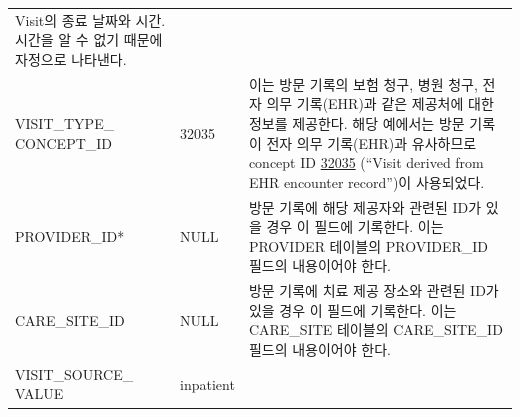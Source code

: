 \documentclass[11pt]{book}
\theoremstyle{definition}
\theoremstyle{definition}
\theoremstyle{definition}
\theoremstyle{remark}
\begin{document}
\begin{longtable}[]{@{}lll@{}}
\begin{minipage}[t]{0.48\columnwidth}
Visit의 종료 날짜와 시간. 시간을 알 수 없기 때문에 자정으로
나타낸다.\strut
\end{minipage}\tabularnewline
\begin{minipage}[t]{0.28\columnwidth}\raggedright\strut
VISIT\_TYPE\_ CONCEPT\_ID\strut
\end{minipage} & \begin{minipage}[t]{0.16\columnwidth}\raggedright\strut
32035\strut
\end{minipage} & \begin{minipage}[t]{0.48\columnwidth}\raggedright\strut
이는 방문 기록의 보험 청구, 병원 청구, 전자 의무 기록(EHR)과 같은
제공처에 대한 정보를 제공한다. 해당 예에서는 방문 기록이 전자 의무
기록(EHR)과 유사하므로 concept ID
\href{http://athena.ohdsi.org/search-terms/terms/32035}{32035} (``Visit
derived from EHR encounter record'')이 사용되었다.\strut
\end{minipage}\tabularnewline
\begin{minipage}[t]{0.28\columnwidth}\raggedright\strut
PROVIDER\_ID*\strut
\end{minipage} & \begin{minipage}[t]{0.16\columnwidth}\raggedright\strut
NULL\strut
\end{minipage} & \begin{minipage}[t]{0.48\columnwidth}\raggedright\strut
방문 기록에 해당 제공자와 관련된 ID가 있을 경우 이 필드에 기록한다. 이는
PROVIDER 테이블의 PROVIDER\_ID 필드의 내용이어야 한다.\strut
\end{minipage}\tabularnewline
\begin{minipage}[t]{0.28\columnwidth}\raggedright\strut
CARE\_SITE\_ID\strut
\end{minipage} & \begin{minipage}[t]{0.16\columnwidth}\raggedright\strut
NULL\strut
\end{minipage} & \begin{minipage}[t]{0.48\columnwidth}\raggedright\strut
방문 기록에 치료 제공 장소와 관련된 ID가 있을 경우 이 필드에 기록한다.
이는 CARE\_SITE 테이블의 CARE\_SITE\_ID 필드의 내용이어야 한다.\strut
\end{minipage}\tabularnewline
\begin{minipage}[t]{0.28\columnwidth}\raggedright\strut
VISIT\_SOURCE\_ VALUE\strut
\end{minipage} & \begin{minipage}[t]{0.16\columnwidth}\raggedright\strut
inpatient\strut
\end{minipage} & \begin{minipage}[t]{0.48\columnwidth}\raggedright\strut

\end{minipage}
\end{longtable}
\end{document}
